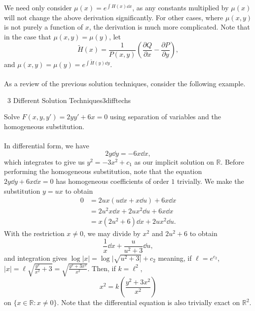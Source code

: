         We need only consider \(\mu(x)=e^{\int H(x)\dd x}\), as any constants multiplied by \(\mu(x)\) will not change the above derivation significantly. For other cases, where \(\mu(x,y)\) is not purely a function of \(x\), the derivation is much more complicated. Note that in the case that \(\mu(x,y)=\mu(y)\), let
        \begin{equation*}
            \tilde{H}(x)=\frac{1}{P(x,y)}\left(\frac{\partial Q}{\partial x}-\frac{\partial P}{\partial y}\right),
        \end{equation*}
        and \(\mu(x,y)=\mu(y)=e^{\int \tilde{H}(y) \dd y}\).
        \pagebreak
        \\
        \\
        As a review of the previous solution techniques, consider the following example.
        \begin{example}{\Difficulty\,\Difficulty\,\,3 Different Solution Techniques}{3difftechs}

            Solve \(F(x,y,y')=2yy'+6x=0\) using separation of variables and the homogeneous substitution.
            \\
            \\
            In differential form, we have
            \begin{equation*}
                2y\dd y=-6x\dd x,
            \end{equation*}
            which integrates to give us \(y^2=-3x^2+c_1\) as our implicit solution on \(\mathbb{R}\). Before performing the homogeneous substitution, note that the equation \(2y\dd y+6x\dd x=0\) has homogeneous coefficients of order \(1\) trivially. We make the substitution \(y=ux\) to obtain
            \begin{align*}
                0&=2ux(u\dd x+x\dd u)+6x\dd x \\
                &=2u^2x\dd x+2ux^2\dd u+6x\dd x \\
                &=x(2u^2+6)\dd x+2ux^2\dd u.
            \end{align*}
            With the restriction \(x\neq0\), we may divide by \(x^2\) and \(2u^2+6\) to obtain
            \begin{equation*}
                \frac{1}{x}\dd x+\frac{u}{u^2+3}\dd u,
            \end{equation*}
            and integration gives \(\log|x|=\log|\sqrt{u^2+3|}+c_2\) meaning, if \(\ell=e^{c_2}\), \(|x|=\ell\sqrt{\frac{y^2}{x^2}+3}=\sqrt{\frac{y^2+3x^2}{x^2}}\). Then, if \(k=\ell^2\),
            \begin{equation*}
                x^2=k\left(\frac{y^2+3x^2}{x^2}\right)
            \end{equation*}
            on \(\{x\in\mathbb{R}:x\neq0\}\). Note that the differential equation is also trivially exact on \(\mathbb{R}^2\).
            
        \end{example}
